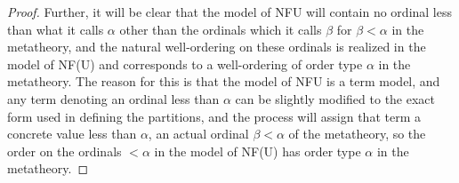 \documentclass{article}
\theoremstyle{definition}
\theoremstyle{remark}
\begin{document}
\begin{proof}
Further, it will be clear that the model of NFU will contain no ordinal less than what it calls $\alpha$ other than the ordinals which it calls $\beta$ for $\beta<\alpha$ in the metatheory, and the natural well-ordering on these ordinals is realized in the model of NF(U) and corresponds to a well-ordering of order type $\alpha$ in the metatheory.  The reason for this is that the model of NFU is a term model, and any term denoting an ordinal less than $\alpha$ can be slightly modified to the exact form used in defining the partitions, and the process will assign that term a concrete value less than $\alpha$, an actual ordinal $\beta<\alpha$ of the metatheory, so the order on the ordinals $<\alpha$ in the model of NF(U) has order type $\alpha$ in the metatheory.







\end{proof}
\end{document}
